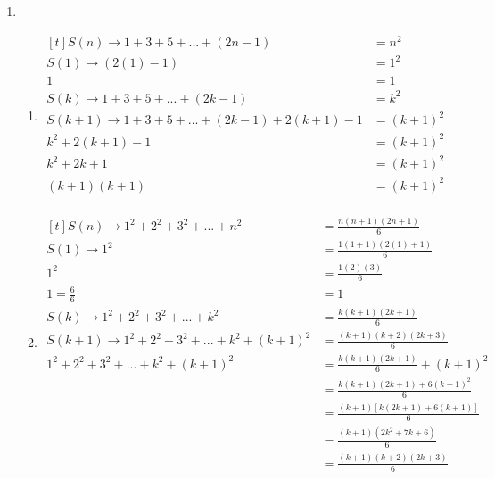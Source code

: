 \begin{enumerate}[leftmargin=2cm,labelsep=.5cm,label=\bf\arabic*.]
\item
\begin{enumerate}
\item $
\begin{aligned}[t]
S(n) \rightarrow 1+3+5+...+(2n-1)&=n^2\\
S(1) \rightarrow (2(1)-1)&=1^2\\
1&=1\\[5mm]
S(k) \rightarrow 1+3+5+...+(2k-1)&=k^2\\
S(k+1) \rightarrow 1+3+5+...+(2k-1) + 2(k+1)-1 &=(k+1)^2\\[5mm]
k^2+2(k+1)-1 &=(k+1)^2\\
k^2+2k+1 &=(k+1)^2\\
(k+1)(k+1)&=(k+1)^2\\[1cm]
\end{aligned} $

\item $
\begin{aligned}[t]
S(n) \rightarrow 1^2+2^2+3^2+...+n^2 &= \frac{n(n+1)(2n+1)}{6}\\
S(1) \rightarrow 1^2&=\frac{1(1+1)(2(1)+1)}{6}\\
1^2&=\frac{1(2)(3)}{6}\\
1=\frac{6}{6}&=1\\[5mm]
S(k) \rightarrow 1^2+2^2+3^2+...+k^2 &= \frac{k(k+1)(2k+1)}{6}\\
S(k+1) \rightarrow 1^2+2^2+3^2+...+k^2 +(k+1)^2 &= \frac{(k+1)(k+2)(2k+3)}{6}\\[5mm]
1^2+2^2+3^2+...+k^2 +(k+1)^2 &= \frac{k(k+1)(2k+1)}{6} + (k+1)^2\\
&=\frac{k(k+1)(2k+1)+6(k+1)^2}{6}\\
&=\frac{(k+1)\left[k(2k+1)+6(k+1)\right]}{6}\\
&=\frac{(k+1)(2k^2+7k+6)}{6}\\
&= \frac{(k+1)(k+2)(2k+3)}{6}
\end{aligned} $
\end{enumerate}

\end{enumerate}
